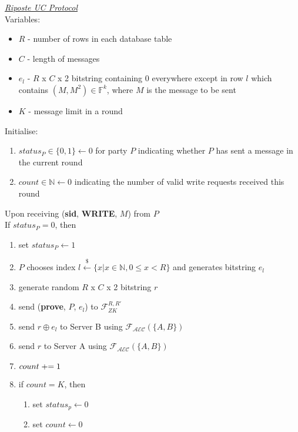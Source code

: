 \begin{tcolorbox}[colback=white, arc=5pt]
\noindent\emph{\underline{Riposte UC Protocol}}\\[5pt]
Variables:
\begin{itemize}
    \item $R$ - number of rows in each database table
    \item $C$ - length of messages
    \item $e_l$ - $R$ x $C$ x 2 bitstring containing 0 everywhere except in row $l$ which contains $(M, M^2)\in \mathbb{F}^k$, where $M$ is the message to be sent
    \item $K$ - message limit in a round
\end{itemize}
 Initialise:
 \begin{enumerate}
     \item $status_P\in\{0,1\}\leftarrow 0$ for party $P$ indicating whether $P$ has sent a message in the current round
     \item $count\in\mathbb{N}\leftarrow 0$ indicating the number of valid write requests received this round
 \end{enumerate}
 
 
\extitem Upon receiving (\textbf{sid}, \textbf{WRITE}, $M$) from $P$\\
If $status_P=0$, then
\begin{enumerate}
    \item set $status_P\leftarrow 1$
    \item $P$ chooses index $l \overset{{\scriptscriptstyle\$}}{\leftarrow} \{x | x \in \mathbb{N}, 0 \le x < R\}$ and generates bitstring $e_l$
    \item generate random $R$ x $C$ x 2 bitstring $r$
    \item send (\textbf{prove}, $P$, $e_l$) to $\mathcal{F}_{ZK}^{R,R'}$
    \item send $r\oplus e_l$ to Server B using $\mathcal{F}_{\mathcal{AEC}}(\{A,B\})$
    \item send $r$ to Server A using $\mathcal{F}_{\mathcal{AEC}}(\{A,B\})$
    
    \item $count \mathrel{+}= 1$
    \item if $count=K$, then
    \begin{enumerate}
        \item set $status_p\leftarrow0$
        \item set $count \leftarrow 0$
    \end{enumerate}
\end{enumerate}


\end{tcolorbox}
